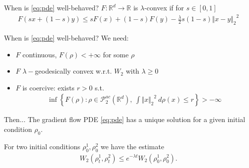 \documentclass[aspectratio=149]{beamer}
\def\real{\mathbb{R}}
\newcommand{\norm}[2]{\ensuremath{\Vert #1 \Vert_{#2}}}
\begin{document}
\begin{frame}{When is \eqref{eq:pde} well-behaved?}
$F:\real^d\rightarrow \real$ is $\lambda$-convex if for $s\in[0, 1]$
\begin{align*}
F(sx+(1-s)y)\leq sF(x)+(1-s)F(y)-\frac {\lambda}{2}s(1-s)\norm{x-y}{2}^{2}
\end{align*}

\begin{figure}
\centering
{}
\end{figure}
\end{frame}


\begin{frame}{When is \eqref{eq:pde} well-behaved?}
We need:
\begin{itemize}
\item $F$ continuous, $F(\rho)<+\infty$ for some $\rho$
\item $F$ $\lambda-$geodesically convex w.r.t. $W_2$ with $\lambda\geq0$
\item $F$ is coercive: exists $r>0$ s.t.
\begin{align*}
\inf\left\lbrace F(\rho): \rho\in\mathcal{P}_{2}^{ac}(\real^{d}), \ \int\norm{x}{2}^{2}\ d\rho(x)\leq r\right\rbrace>-\infty
\end{align*}
\end{itemize}
\end{frame}

\begin{frame}{Then...}
The gradient flow PDE \eqref{eq:pde} has a unique solution for a given initial condition $\rho_0$.

\vspace{5mm}

For two initial conditions $\rho_0^1, \rho_0^2$ we have the estimate
\begin{align*}
W_{2}(\rho_{t}^{1},\rho_{t}^{2})\leq e^{-\lambda t}W_{2}(\rho_{0}^{1},\rho_{0}^{2}).
\end{align*}
\end{frame}
\end{document}
